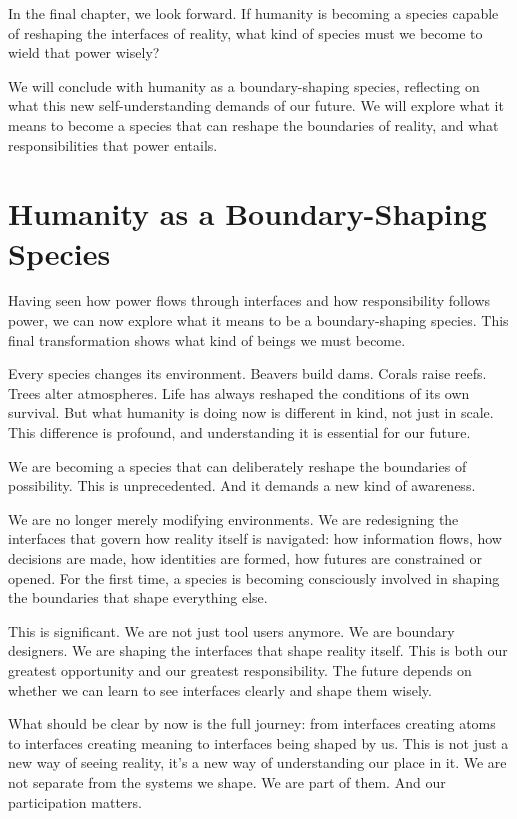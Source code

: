 \documentclass[
  openright]{book}
\begin{document}
In the final chapter, we look forward. If humanity is becoming a species
capable of reshaping the interfaces of reality, what kind of species
must we become to wield that power wisely?

We will conclude with humanity as a boundary-shaping species, reflecting
on what this new self-understanding demands of our future. We will
explore what it means to become a species that can reshape the
boundaries of reality, and what responsibilities that power entails.

\chapter{\texorpdfstring{Humanity as a Boundary-Shaping
Species}{Humanity as a Boundary-Shaping Species}}\label{humanity-as-a-boundary-shaping-species}

Having seen how power flows through interfaces and how responsibility
follows power, we can now explore what it means to be a boundary-shaping
species. This final transformation shows what kind of beings we must
become.

Every species changes its environment. Beavers build dams. Corals raise
reefs. Trees alter atmospheres. Life has always reshaped the conditions
of its own survival. But what humanity is doing now is different in
kind, not just in scale. This difference is profound, and understanding
it is essential for our future.

We are becoming a species that can deliberately reshape the boundaries
of possibility. This is unprecedented. And it demands a new kind of
awareness.

We are no longer merely modifying environments. We are redesigning the
interfaces that govern how reality itself is navigated: how information
flows, how decisions are made, how identities are formed, how futures
are constrained or opened. For the first time, a species is becoming
consciously involved in shaping the boundaries that shape everything
else.

This is significant. We are not just tool users anymore. We are boundary
designers. We are shaping the interfaces that shape reality itself. This
is both our greatest opportunity and our greatest responsibility. The
future depends on whether we can learn to see interfaces clearly and
shape them wisely.

What should be clear by now is the full journey: from interfaces
creating atoms to interfaces creating meaning to interfaces being shaped
by us. This is not just a new way of seeing reality, it's a new way of
understanding our place in it. We are not separate from the systems we
shape. We are part of them. And our participation matters.
\end{document}
